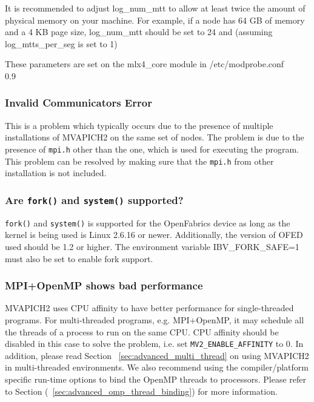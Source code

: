 
It is recommended to adjust log\_num\_mtt to allow at least twice the amount of physical memory on your machine. 
For example, if a node has 64 GB of memory and a 4 KB page size, log\_num\_mtt should be set to 24 and 
(assuming log\_mtts\_per\_seg is set to 1) 

These parameters are set on the mlx4\_core module in /etc/modprobe.conf \\
 {0.9}

\subsubsection{Invalid Communicators Error}

This is a problem which typically occurs due to the presence of
multiple installations of MVAPICH2 on the same set of nodes. The
problem is due to the presence of \texttt{mpi.h} other than the
one, which is used for executing the program. This problem can be
resolved by making sure that the \texttt {mpi.h} from other
installation is not included.

\subsubsection{Are \texttt{fork()} and \texttt{system()} supported?}

\texttt{fork()} and \texttt{system()} is supported for the OpenFabrics
device as long as the kernel is being used is Linux 2.6.16 or newer.
Additionally, the version of OFED used should be 1.2 or higher.  The
environment variable IBV\_FORK\_SAFE=1 must also be set to enable fork
support.

\subsubsection{MPI+OpenMP shows bad performance} MVAPICH2 uses CPU
affinity to have better performance for single-threaded programs. For
multi-threaded programs, e.g. MPI+OpenMP, it may schedule all the
threads of a process to run on the same CPU. CPU affinity should be
disabled in this case to solve the problem, i.e. set
\texttt{MV2\_ENABLE\_AFFINITY} to 0. In addition, please read Section
~\ref{sec:advanced_multi_thread} on using MVAPICH2 in multi-threaded
environments. We also recommend using the compiler/platform specific run-time
options to bind the OpenMP threads to processors. Please refer to 
Section (~\ref{sec:advanced_omp_thread_binding}) for more information. 


